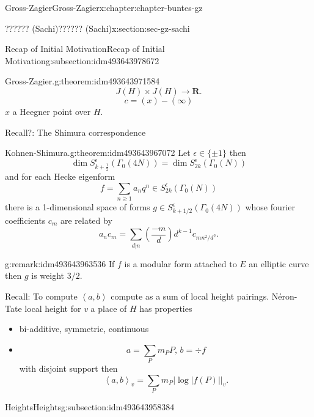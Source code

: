 \documentclass[oneside,10pt,]{book}
\numberwithin{equation}{section}
\newcommand{\legendre}[2]{\left(\frac{#1}{#2}\right)}
\newcommand{\pair}[2]{\left\langle #1, #2 \right\rangle}
\newcommand{\RR}{\mathbf{R}}
\begin{document}
\begin{chapterptx}{Gross-Zagier}{}{Gross-Zagier}{}{}{x:chapter:chapter-buntes-gz}
\begin{sectionptx}{?????? (Sachi)}{}{?????? (Sachi)}{}{}{x:section:sec-gz-sachi}
\begin{subsectionptx}{Recap of Initial Motivation}{}{Recap of Initial Motivation}{}{}{g:subsection:idm493643978672}
\begin{theorem}{Gross-Zagier.}{}{g:theorem:idm493643971584}
\begin{equation*}
J(H)\times J(H) \to \RR\text{.}
\end{equation*}
%
\begin{equation*}
c = (x) - (\infty )
\end{equation*}
\(x\) a Heegner point over \(H\).%
\end{theorem}
Recall?: The Shimura correspondence%
\begin{theorem}{Kohnen-Shimura.}{}{g:theorem:idm493643967072}%
Let \(\epsilon \in \{\pm 1\}\)  then%
\begin{equation*}
\dim S_{k+\frac{1}{2}}^\epsilon  (\Gamma_0 (4N)) = \dim S_{2k}^\epsilon (\Gamma _0(N))
\end{equation*}
and for each Hecke eigenform%
\begin{equation*}
f = \sum_{n\ge 1} a_n q^n\in S^\epsilon _{2k} (\Gamma _0(N))
\end{equation*}
there is a 1-dimensional space of  forms \(g \in S_{k+1/2}^\epsilon (\Gamma _0(4N))\) whose fourier coefficients  \(c_m\) are related by%
\begin{equation*}
a_n c_m= \sum _{d|n} \legendre{-m}d d^{k-1}c_{mn^2/d^2}\text{.}
\end{equation*}
%
\end{theorem}
\begin{remark}{}{g:remark:idm493643963536}%
If \(f \) is a modular form attached to \(E\) an elliptic curve then \(g\) is weight \(3/2\).%
\end{remark}
Recall: To compute \(\pair ab\) compute as a sum of local height pairings. Néron-Tate local height for \(v\) a place of \(H\) has properties%
\begin{itemize}[label=\textbullet]
\item{}bi-additive, symmetric, continuous%
\item{}%
\begin{equation*}
a=\sum_P m_P P,\,b = \div f
\end{equation*}
with disjoint support then%
\begin{equation*}
\pair ab_v = \sum_P m_P |\log |f(P)||_v\text{.}
\end{equation*}
%
\end{itemize}
%
\end{subsectionptx}
%
%
\typeout{************************************************}
\typeout{************************************************}
%
\begin{subsectionptx}{Heights}{}{Heights}{}{}{g:subsection:idm493643958384}

\end{subsectionptx}
\end{sectionptx}
\end{chapterptx}
\end{document}
